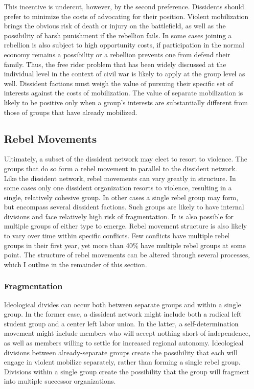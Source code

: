This incentive is undercut, however, by the second preference. Dissidents should prefer to minimize the costs of advocating for their position. Violent mobilization brings the obvious risk of death or injury on the battlefield, as well as the possibility of harsh punishment if the rebellion fails. In some cases joining a rebellion is also subject to high opportunity costs, if participation in the normal economy remains a possibility or a rebellion prevents one from defend their family. Thus, the free rider problem that has been widely discussed at the individual level in the context of civil war \citep[e.g.][]{Lichbach1995,Wood2003} is likely to apply at the group level as well. Dissident factions must weigh the value of pursuing their specific set of interests against the costs of mobilization. The value of separate mobilization is likely to be positive only when a group's interests are substantially different from those of groups that have already mobilized.

\subsection{Rebel Movements}

Ultimately, a subset of the dissident network may elect to resort to violence. The groups that do so form a rebel movement in parallel to the dissident network. Like the dissident network, rebel movements can vary greatly in structure. In some cases only one dissident organization resorts to violence, resulting in a single, relatively cohesive group. In other cases a single rebel group may form, but encompass several dissident factions. Such groups are likely to have internal divisions and face relatively high risk of fragmentation. It is also possible for multiple groups of either type to emerge. Rebel movement structure is also likely to vary over time within specific conflicts. Few conflicts have multiple rebel groups in their first year, yet more than 40\% have multiple rebel groups at some point. The structure of rebel movements can be altered through several processes, which I outline in the remainder of this section.

\subsubsection{Fragmentation}

Ideological divides can occur both between separate groups and within a single group. In the former case, a dissident network might include both a radical left student group and a center left labor union. In the latter, a self-determination movement might include members who will accept nothing short of independence, as well as members willing to settle for increased regional autonomy. Ideological divisions between already-separate groups create the possibility that each will engage in violent mobilize separately, rather than forming a single rebel group. Divisions within a single group create the possibility that the group will fragment into multiple successor organizations. 

